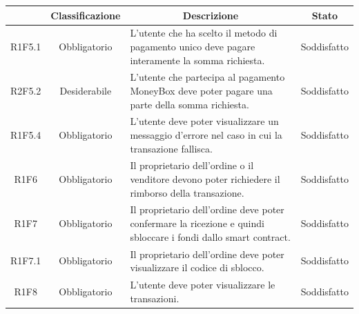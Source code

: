 \begin{table}[H]
    \centering
    \renewcommand{\arraystretch}{1.8}
    \begin{tabular}{c | c | p{6cm} | c}
        \rowcolor[HTML]{125E28}
        \multicolumn{1}{c}{\color[HTML]{FFFFFF} \textbf{Codice}}          &
        \multicolumn{1}{c}{\color[HTML]{FFFFFF} \textbf{Classificazione}} &
        \multicolumn{1}{c}{\color[HTML]{FFFFFF} \textbf{Descrizione}}     &
        \multicolumn{1}{c}{\color[HTML]{FFFFFF} \textbf{Stato}}                                                                                                                                                                                          \\
        \hline
        R1F5.1                                                            & Obbligatorio & L'utente che ha scelto il metodo di pagamento unico deve pagare interamente la somma richiesta.                       & Soddisfatto      \\
        R2F5.2                                                            & Desiderabile & L'utente che partecipa al pagamento MoneyBox\glo{} deve poter pagare una parte della somma richiesta.                 & Soddisfatto      \\
        R1F5.4                                                            & Obbligatorio & L'utente deve poter visualizzare un messaggio d'errore nel caso in cui la transazione fallisca.                       & Soddisfatto                               \\
        R1F6                                                              & Obbligatorio & Il proprietario dell'ordine o il venditore devono poter richiedere il rimborso della transazione.                     & Soddisfatto   \\
        R1F7                                                              & Obbligatorio & Il proprietario dell'ordine deve poter confermare la ricezione e quindi sbloccare i fondi dallo smart contract\glo{}. & Soddisfatto   \\
        R1F7.1                                                            & Obbligatorio & Il proprietario dell'ordine deve poter visualizzare il codice di sblocco.                                             & Soddisfatto   \\
        R1F8                                                              & Obbligatorio & L'utente deve poter visualizzare le transazioni.                                                                      & Soddisfatto   \\

\end{tabular}
\end{table}
